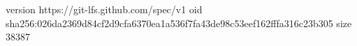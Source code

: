 version https://git-lfs.github.com/spec/v1
oid sha256:026da2369d84cf2d9cfa6370ea1a536f7fa43de98c53eef162fffa316c23b305
size 38387
